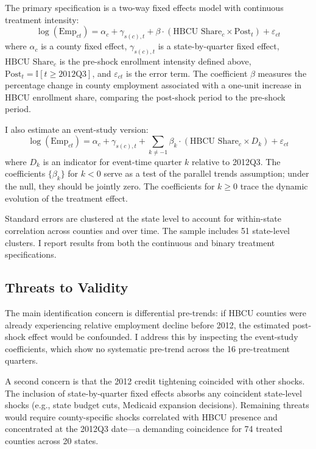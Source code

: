 \documentclass[12pt]{article}
\newcommand{\ind}{\mathbb{I}}
\begin{document}
The primary specification is a two-way fixed effects model with continuous treatment intensity:
\begin{equation}
\log(\text{Emp}_{ct}) = \alpha_c + \gamma_{s(c),t} + \beta \cdot (\text{HBCU Share}_c \times \text{Post}_t) + \varepsilon_{ct}
\label{eq:static}
\end{equation}
where $\alpha_c$ is a county fixed effect, $\gamma_{s(c),t}$ is a state-by-quarter fixed effect, $\text{HBCU Share}_c$ is the pre-shock enrollment intensity defined above, $\text{Post}_t = \ind[t \geq \text{2012Q3}]$, and $\varepsilon_{ct}$ is the error term. The coefficient $\beta$ measures the percentage change in county employment associated with a one-unit increase in HBCU enrollment share, comparing the post-shock period to the pre-shock period.

I also estimate an event-study version:
\begin{equation}
\log(\text{Emp}_{ct}) = \alpha_c + \gamma_{s(c),t} + \sum_{k \neq -1} \beta_k \cdot (\text{HBCU Share}_c \times D_k) + \varepsilon_{ct}
\label{eq:eventstudy}
\end{equation}
where $D_k$ is an indicator for event-time quarter $k$ relative to 2012Q3. The coefficients $\{\beta_k\}$ for $k < 0$ serve as a test of the parallel trends assumption; under the null, they should be jointly zero. The coefficients for $k \geq 0$ trace the dynamic evolution of the treatment effect.

Standard errors are clustered at the state level to account for within-state correlation across counties and over time. The sample includes 51 state-level clusters. I report results from both the continuous and binary treatment specifications.

\subsection{Threats to Validity}

The main identification concern is differential pre-trends: if HBCU counties were already experiencing relative employment decline before 2012, the estimated post-shock effect would be confounded. I address this by inspecting the event-study coefficients, which show no systematic pre-trend across the 16 pre-treatment quarters.

A second concern is that the 2012 credit tightening coincided with other shocks. The inclusion of state-by-quarter fixed effects absorbs any coincident state-level shocks (e.g., state budget cuts, Medicaid expansion decisions). Remaining threats would require county-specific shocks correlated with HBCU presence and concentrated at the 2012Q3 date---a demanding coincidence for 74 treated counties across 20 states.
\end{document}
